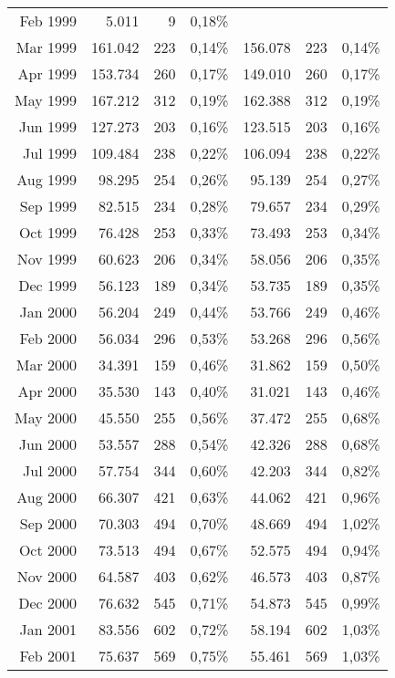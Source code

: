 \begin{longtable}{r|rrr|rrr}
Feb 1999 & 5.011   & 9     & 0,18\% &         &       &        \\
Mar 1999 & 161.042 & 223   & 0,14\% & 156.078 & 223   & 0,14\% \\
Apr 1999 & 153.734 & 260   & 0,17\% & 149.010 & 260   & 0,17\% \\
May 1999 & 167.212 & 312   & 0,19\% & 162.388 & 312   & 0,19\% \\
Jun 1999 & 127.273 & 203   & 0,16\% & 123.515 & 203   & 0,16\% \\
Jul 1999 & 109.484 & 238   & 0,22\% & 106.094 & 238   & 0,22\% \\
Aug 1999 & 98.295  & 254   & 0,26\% & 95.139  & 254   & 0,27\% \\
Sep 1999 & 82.515  & 234   & 0,28\% & 79.657  & 234   & 0,29\% \\
Oct 1999 & 76.428  & 253   & 0,33\% & 73.493  & 253   & 0,34\% \\
Nov 1999 & 60.623  & 206   & 0,34\% & 58.056  & 206   & 0,35\% \\
Dec 1999 & 56.123  & 189   & 0,34\% & 53.735  & 189   & 0,35\% \\
Jan 2000 & 56.204  & 249   & 0,44\% & 53.766  & 249   & 0,46\% \\
Feb 2000 & 56.034  & 296   & 0,53\% & 53.268  & 296   & 0,56\% \\
Mar 2000 & 34.391  & 159   & 0,46\% & 31.862  & 159   & 0,50\% \\
Apr 2000 & 35.530  & 143   & 0,40\% & 31.021  & 143   & 0,46\% \\
May 2000 & 45.550  & 255   & 0,56\% & 37.472  & 255   & 0,68\% \\
Jun 2000 & 53.557  & 288   & 0,54\% & 42.326  & 288   & 0,68\% \\
Jul 2000 & 57.754  & 344   & 0,60\% & 42.203  & 344   & 0,82\% \\
Aug 2000 & 66.307  & 421   & 0,63\% & 44.062  & 421   & 0,96\% \\
Sep 2000 & 70.303  & 494   & 0,70\% & 48.669  & 494   & 1,02\% \\
Oct 2000 & 73.513  & 494   & 0,67\% & 52.575  & 494   & 0,94\% \\
Nov 2000 & 64.587  & 403   & 0,62\% & 46.573  & 403   & 0,87\% \\
Dec 2000 & 76.632  & 545   & 0,71\% & 54.873  & 545   & 0,99\% \\
Jan 2001 & 83.556  & 602   & 0,72\% & 58.194  & 602   & 1,03\% \\
Feb 2001 & 75.637  & 569   & 0,75\% & 55.461  & 569   & 1,03\% \\

\end{longtable}

